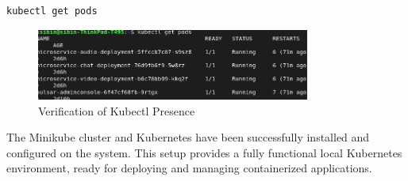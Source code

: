 \begin{lstlisting}
kubectl get pods
\end{lstlisting}

\begin{figure}[h!]
    \centering
    \includegraphics[width=0.8\textwidth]{implementation/pods.png}
    \caption{Verification of Kubectl Presence}
    \label{fig:kgetpods}
\end{figure}

The Minikube cluster and Kubernetes have been successfully installed and configured on the system. This setup provides a fully functional local Kubernetes environment, ready for deploying and managing containerized applications.








